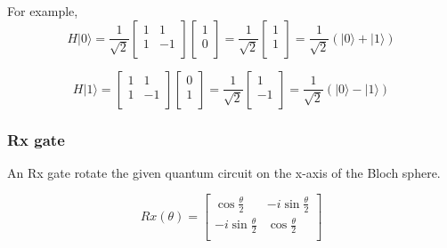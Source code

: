 For example,
\begin{equation}
H|0\rangle = \frac{1}{\sqrt{2}}\begin{bmatrix}
1 & 1\\
1 & -1 \\
\end{bmatrix}\left[
\begin{array}{c}
1 \\
0 \\
\end{array}
\right]
= \frac{1}{\sqrt{2}} \left[
\begin{array}{c}
1 \\
1 \\
\end{array}
\right]
= \frac{1}{\sqrt{2}} (|0\rangle + |1\rangle)
\end{equation}

\begin{equation}
H|1\rangle = \begin{bmatrix}
1 & 1\\
1 & -1 \\
\end{bmatrix} 
\left[
\begin{array}{c}
0 \\
1  \\
\end{array}
\right]
= \frac{1}{\sqrt{2}} \left[
\begin{array}{c}
1 \\
-1 \\
\end{array}
\right]
=\frac{1}{\sqrt{2}} (|0\rangle - |1\rangle)
\end{equation}

\subsubsection{Rx gate}
 An Rx gate rotate the given quantum circuit on the x-axis of the Bloch sphere.
 
 \begin{equation}
  Rx(\theta) = \begin{bmatrix}
\cos{\frac{\theta}{2}} & -i\sin{\frac{\theta}{2}} \\
 -i\sin{\frac{\theta}{2}} & \cos{\frac{\theta}{2}}  \\
\end{bmatrix}
\end{equation}
 

